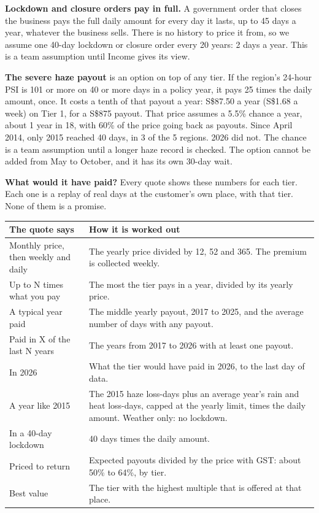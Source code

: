 \documentclass[11pt,a4paper]{article}
\newcommand{\head}{\rowcolor{soft}}
\newcommand{\sgd}{\textup{S\$}}
\begin{document}
\textbf{Lockdown and closure orders pay in full.} A government order that closes the business pays the full daily amount for every day it lasts, up to 45 days a year, whatever the business sells. There is no history to price it from, so we assume one 40-day lockdown or closure order every 20 years: 2 days a year. This is a team assumption until Income gives its view.

\textbf{The severe haze payout} is an option on top of any tier. If the region's 24-hour PSI is 101 or more on 40 or more days in a policy year, it pays 25 times the daily amount, once. It costs a tenth of that payout a year: \sgd 87.50 a year (\sgd 1.68 a week) on Tier 1, for a \sgd 875 payout. That price assumes a 5.5\% chance a year, about 1 year in 18, with 60\% of the price going back as payouts. Since April 2014, only 2015 reached 40 days, in 3 of the 5 regions. 2026 did not. The chance is a team assumption until a longer haze record is checked. The option cannot be added from May to October, and it has its own 30-day wait.

\textbf{What would it have paid?} Every quote shows these numbers for each tier. Each one is a replay of real days at the customer's own place, with that tier. None of them is a promise.

{\small
\begin{xltabular}{\textwidth}{|K{4.4cm}|Y|}
\hline
\head The quote says & \textbf{How it is worked out} \\
\hline
\endhead
Monthly price, then weekly and daily & The yearly price divided by 12, 52 and 365. The premium is collected weekly. \\
\hline
Up to N times what you pay & The most the tier pays in a year, divided by its yearly price. \\
\hline
A typical year paid & The middle yearly payout, 2017 to 2025, and the average number of days with any payout. \\
\hline
Paid in X of the last N years & The years from 2017 to 2026 with at least one payout. \\
\hline
In 2026 & What the tier would have paid in 2026, to the last day of data. \\
\hline
A year like 2015 & The 2015 haze loss-days plus an average year's rain and heat loss-days, capped at the yearly limit, times the daily amount. Weather only: no lockdown. \\
\hline
In a 40-day lockdown & 40 days times the daily amount. \\
\hline
Priced to return & Expected payouts divided by the price with GST: about 50\% to 64\%, by tier. \\
\hline
Best value & The tier with the highest multiple that is offered at that place. \\
\hline
\end{xltabular}}
\end{document}
